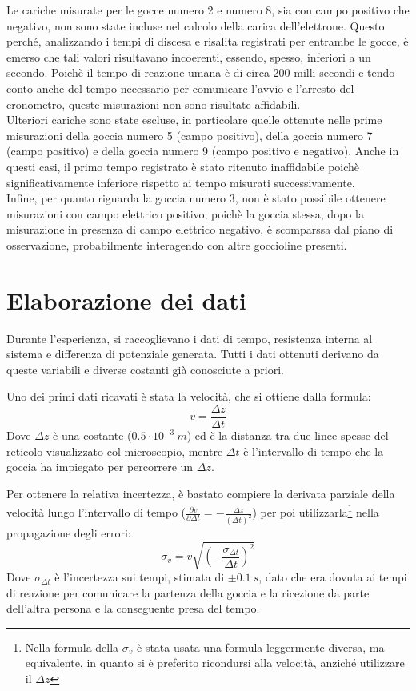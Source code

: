 \documentclass{article}
\begin{document}
Le cariche misurate per le gocce numero 2 e numero 8, sia con campo positivo che negativo, non sono state incluse nel calcolo della carica dell'elettrone. Questo perché, analizzando i tempi di discesa e risalita registrati per entrambe le gocce, è emerso che tali valori risultavano incoerenti, essendo, spesso, inferiori a un secondo. Poichè il tempo di reazione umana è di circa 200 milli secondi e tendo conto anche del tempo necessario per comunicare l'avvio e l'arresto del cronometro, queste misurazioni non sono risultate affidabili.\\

Ulteriori cariche sono state escluse, in particolare quelle ottenute nelle prime misurazioni della goccia numero 5 (campo positivo), della goccia numero 7 (campo positivo) e della goccia numero 9 (campo positivo e negativo). Anche in questi casi, il primo tempo registrato è stato ritenuto inaffidabile poichè significativamente inferiore rispetto ai tempo misurati successivamente.\\

Infine, per quanto riguarda la goccia numero 3, non è stato possibile ottenere misurazioni con campo elettrico positivo, poichè la goccia stessa, dopo la misurazione in presenza di campo elettrico negativo, è scomparssa dal piano di osservazione, probabilmente interagendo con altre goccioline presenti.

\section{Elaborazione dei dati}
Durante l'esperienza, si raccoglievano i dati di tempo, resistenza interna al sistema e differenza di potenziale generata. Tutti i dati ottenuti derivano da queste variabili e diverse costanti già conosciute a priori.

Uno dei primi dati ricavati è stata la velocità, che si ottiene dalla formula:
\begin{equation}
	v=\frac{\Delta z}{\Delta t}
	\label{velocita_limite}
\end{equation}
Dove $\Delta z$ è una costante ($0.5\cdot10^{-3}\ m$) ed è la distanza tra due linee spesse del reticolo visualizzato col microscopio, mentre $\Delta t$ è l'intervallo di tempo che la goccia ha impiegato per percorrere un $\Delta z$.

Per ottenere la relativa incertezza, è bastato compiere la derivata parziale della velocità lungo l'intervallo di tempo ($\frac{\partial v}{\partial \Delta t}=-\frac{\Delta z}{(\Delta t)^2}$) per poi utilizzarla\footnote{Nella formula della $\sigma_v$ è stata usata una formula leggermente diversa, ma equivalente, in quanto si è preferito ricondursi alla velocità, anziché utilizzare il $\Delta z$} nella propagazione degli errori:
\begin{equation}
	\sigma_v=v\sqrt{\left(-\frac{\sigma_{\Delta t}}{\Delta t}\right)^2}
	\label{sigma_v}
\end{equation}
Dove $\sigma_{\Delta t}$ è l'incertezza sui tempi, stimata di $\pm0.1\ s$, dato che era dovuta ai tempi di reazione per comunicare la partenza della goccia e la ricezione da parte dell'altra persona e la conseguente presa del tempo.\\
\end{document}
